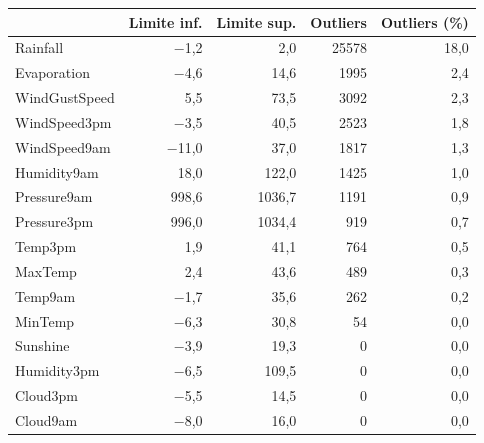 \begin{tabular}{lrrrr}
\toprule
 & Limite inf. & Limite sup. & Outliers & Outliers (\%) \\
\midrule
Rainfall & $-$1,2 & 2,0 & 25578 & 18,0 \\
Evaporation & $-$4,6 & 14,6 & 1995 & 2,4 \\
WindGustSpeed & 5,5 & 73,5 & 3092 & 2,3 \\
WindSpeed3pm & $-$3,5 & 40,5 & 2523 & 1,8 \\
WindSpeed9am & $-$11,0 & 37,0 & 1817 & 1,3 \\
Humidity9am & 18,0 & 122,0 & 1425 & 1,0 \\
Pressure9am & 998,6 & 1036,7 & 1191 & 0,9 \\
Pressure3pm & 996,0 & 1034,4 & 919 & 0,7 \\
Temp3pm & 1,9 & 41,1 & 764 & 0,5 \\
MaxTemp & 2,4 & 43,6 & 489 & 0,3 \\
Temp9am & $-$1,7 & 35,6 & 262 & 0,2 \\
MinTemp & $-$6,3 & 30,8 & 54 & 0,0 \\
Sunshine & $-$3,9 & 19,3 & 0 & 0,0 \\
Humidity3pm & $-$6,5 & 109,5 & 0 & 0,0 \\
Cloud3pm & $-$5,5 & 14,5 & 0 & 0,0 \\
Cloud9am & $-$8,0 & 16,0 & 0 & 0,0 \\
\bottomrule
\end{tabular}
